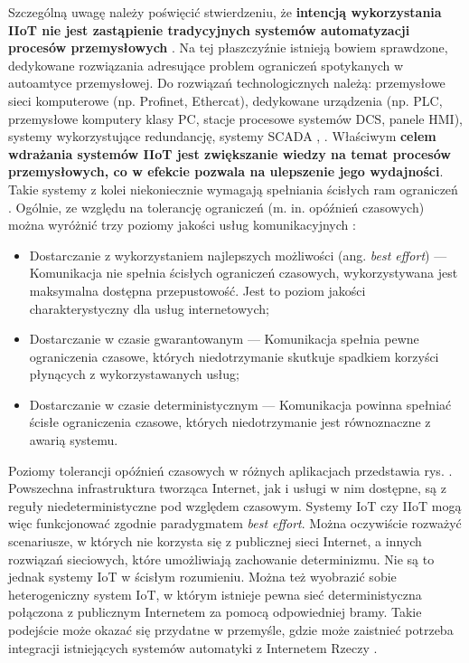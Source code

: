 \documentclass[a4paper, 12pt, twoside]{article}
\begin{document}
Szczególną uwagę należy poświęcić stwierdzeniu, że \textbf{intencją wykorzystania IIoT nie 
jest zastąpienie tradycyjnych systemów automatyzacji procesów przemysłowych} \cite{iiot-challenges-opportunities-directions}. 
Na tej płaszczyźnie istnieją bowiem sprawdzone, dedykowane rozwiązania adresujące
problem ograniczeń spotykanych w autoamtyce przemysłowej. Do rozwiązań technologicznych należą: przemysłowe sieci komputerowe
(np. Profinet, Ethercat), dedykowane urządzenia 
(np. PLC, przemysłowe komputery klasy PC, stacje procesowe systemów DCS, panele HMI),
systemy wykorzystujące redundancję, systemy SCADA \cite{isp}, \cite{systemy-automatyki-przemyslowej}.
Właściwym \textbf{celem wdrażania systemów IIoT jest zwiększanie wiedzy na temat procesów
przemysłowych, co w efekcie pozwala na ulepszenie jego wydajności}. Takie systemy
z kolei niekoniecznie wymagają spełniania ścisłych ram ograniczeń 
\cite{iiot-challenges-opportunities-directions}. 
Ogólnie, ze względu na tolerancję ograniczeń (m. in. opóźnień czasowych) można 
wyróżnić trzy poziomy jakości usług komunikacyjnych \cite{iot-hype-to-reality}: 
\begin{itemize}
    \itemsep0em 
    \item Dostarczanie z wykorzystaniem najlepszych możliwości (ang. \emph{best effort})
    --- Komunikacja nie spełnia ścisłych ograniczeń czasowych, wykorzystywana jest 
    maksymalna dostępna przepustowość. Jest to poziom jakości charakterystyczny
    dla usług internetowych;
    \item Dostarczanie w czasie gwarantowanym
    --- Komunikacja spełnia pewne ograniczenia czasowe, których niedotrzymanie
    skutkuje spadkiem korzyści płynących z wykorzystawanych usług;
    \item Dostarczanie w czasie deterministycznym
    --- Komunikacja powinna spełniać ścisłe ograniczenia czasowe,
    których niedotrzymanie jest równoznaczne z awarią systemu.
\end{itemize}
Poziomy tolerancji opóźnień czasowych w różnych aplikacjach przedstawia rys. .
Powszechna infrastruktura tworząca Internet, jak i usługi w nim dostępne, są z reguły
niedeterministyczne pod względem czasowym. Systemy IoT czy IIoT mogą więc
funkcjonować zgodnie paradygmatem \emph{best effort}. Można oczywiście rozważyć
scenariusze, w których nie korzysta się z publicznej sieci Internet, a innych
rozwiązań sieciowych, które umożliwiają zachowanie determinizmu. Nie są to jednak
systemy IoT w ścisłym rozumieniu. Można też wyobrazić sobie heterogeniczny system
IoT, w którym istnieje pewna sieć deterministyczna połączona z publicznym Internetem
za pomocą odpowiedniej bramy. Takie podejście może okazać się przydatne w przemyśle, gdzie 
może zaistnieć potrzeba integracji istniejących systemów automatyki z Internetem Rzeczy \cite{iiot-design-and-impl-gateway}.
\end{document}
